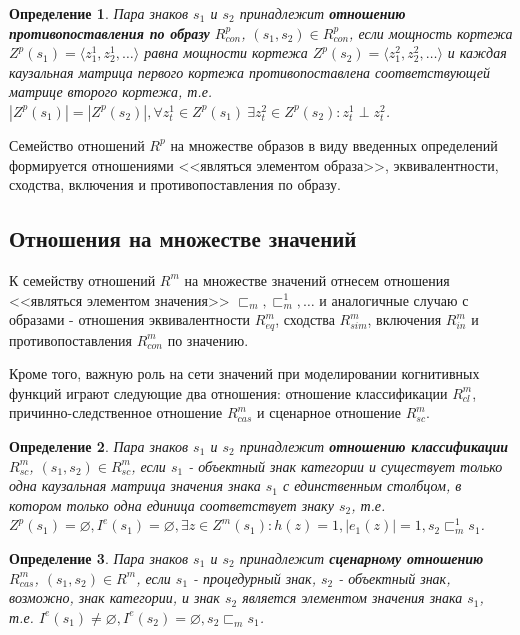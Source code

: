 \documentclass[12pt]{scrartcl}
\newtheorem{definition}{Определение}
\begin{document}
	\begin{definition}
		Пара знаков  $s_1$ и $s_2$ принадлежит \textbf{отношению противопоставления по образу} $R_{con}^p$, $(s_1,s_2)\in R_{con}^p$, если мощность кортежа $Z^p(s_1)=\langle z_1^1,z_2^1,\dots\rangle$ равна мощности кортежа $Z^p(s_2)=\langle z_1^2,z_2^2,\dots\rangle$ и каждая каузальная матрица первого кортежа противопоставлена соответствующей матрице второго кортежа, т.е. $|Z^p(s_1)| = |Z^p(s_2)|, \forall z_t^1\in Z^p(s_1)\ \exists z_t^2\in Z^p(s_2): z_t^1\perp z_t^2$.
	\end{definition}
	
	Семейство отношений $R^p$ на множестве образов в виду введенных определений формируется отношениями <<являться элементом образа>>, эквивалентности, сходства, включения и противопоставления по образу.
		
	\subsection{Отношения на множестве значений}	
	
	К семейству отношений $R^m$ на множестве значений отнесем отношения <<являться элементом значения>> ${\sqsubset_m,\sqsubset_m^1,\dots}$ и аналогичные случаю с образами - отношения эквивалентности $R_{eq}^m$, сходства $R_{sim}^m$, включения $R_{in}^m$ и противопоставления $R_{con}^m$ по значению.
	
	Кроме того, важную роль на сети значений при моделировании когнитивных функций играют следующие два отношения: отношение классификации $R_{cl}^m$, причинно-следственное отношение $R_{cas}^m$ и сценарное отношение $R_{sc}^m$.

	
	\begin{definition}
		Пара знаков $s_1$ и $s_2$ принадлежит \textbf{отношению классификации} $R_{sc}^m$, $(s_1,s_2)\in R_{sc}^m$, если $s_1$ - объектный знак категории и существует только одна каузальная матрица значения знака $s_1$ с единственным столбцом, в котором только одна единица соответствует знаку $s_2$, т.е. $Z^p(s_1)=\varnothing, I^e(s_1)=\varnothing, \exists z\in Z^m(s_1): h(z)=1, |e_1(z)|=1, s_2\sqsubset_m^1 s_1$.
	\end{definition}
	
	\begin{definition}
		Пара знаков $s_1$ и $s_2$ принадлежит \textbf{сценарному отношению} $R_{cas}^m$, $(s_1,s_2)\in R_{}^m$, если $s_1$ - процедурный знак, $s_2$ - объектный знак, возможно, знак категории, и знак $s_2$ является элементом значения знака $s_1$, т.е. $I^e(s_1)\not = \varnothing, I^e(s_2) = \varnothing, s_2\sqsubset_m s_1$.
	\end{definition}
	
\end{document}
